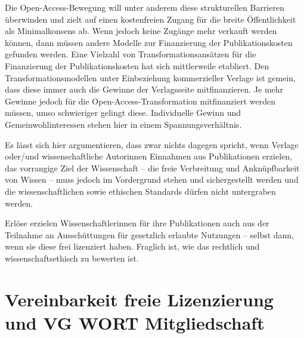 \documentclass[a4paper,
fontsize=11pt,
oneside,
numbers=noperiodatend,
parskip=half-,
bibliography=totoc,
final
]{scrartcl}
\begin{document}
Die Open-Access-Bewegung will unter anderem diese strukturellen
Barrieren überwinden und zielt auf einen kostenfreien Zugang für die
breite Öffentlichkeit als Minimalkonsens ab. Wenn jedoch keine Zugänge
mehr verkauft werden können, dann müssen andere Modelle zur Finanzierung
der Publikationskosten gefunden werden. Eine Vielzahl von
Transformationsansätzen für die Finanzierung der Publikationskosten hat
sich mittlerweile etabliert. Den Transformationsmodellen unter
Einbeziehung kommerzieller Verlage ist gemein, dass diese immer auch die
Gewinne der Verlagsseite mitfinanzieren. Je mehr Gewinne jedoch für die
Open-Access-Transformation mitfinanziert werden müssen, umso schwieriger
gelingt diese. Individuelle Ge\-winn\- und Gemeinwohlinteressen stehen hier
in einem Spannungsverhältnis.

Es lässt sich hier argumentieren, dass zwar nichts dagegen spricht, wenn
Verlage oder/und wissenschaftliche Autorinnen Einnahmen aus
Publikationen erzielen, das vorrangige Ziel der Wissenschaft -- die
freie Verbreitung und Anknüpfbarkeit von Wissen -- muss jedoch im
Vordergrund stehen und sichergestellt werden und die wissenschaftlichen
sowie ethischen Standards dürfen nicht untergraben werden.

Erlöse erzielen Wissenschaftlerinnen für ihre Publikationen auch aus der
Teilnahme an Ausschüttungen für gesetzlich erlaubte Nutzungen -- selbst
dann, wenn sie diese frei lizenziert haben. Fraglich ist, wie das
rechtlich und wissenschaftsethisch zu bewerten ist.

\hypertarget{vereinbarkeit-freie-lizenzierung-und-vg-wort-mitgliedschaft}{%
\section{Vereinbarkeit freie Lizenzierung und VG WORT
Mitgliedschaft}\label{vereinbarkeit-freie-lizenzierung-und-vg-wort-mitgliedschaft}}
\end{document}
